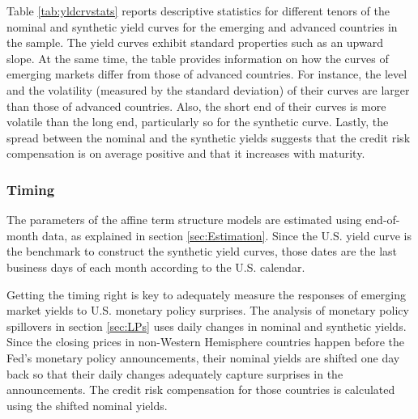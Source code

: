 {Table \ref{tab:yldcrvstats} reports descriptive statistics for different tenors of the nominal and synthetic yield curves for the emerging and advanced countries in the sample. 
The yield curves exhibit standard properties such as an 
upward slope.
At the same time, the table provides information on how the curves of emerging markets differ from those of advanced countries. 
For instance, the level and the volatility (measured by the standard deviation) of their curves %
are larger than those of advanced countries.
Also, the short end of their curves is more volatile than the long end, particularly so for the synthetic curve.
Lastly, the spread between the nominal and the synthetic yields suggests that the credit risk compensation is on average positive and that it increases with maturity.




\subsubsection{Timing}
The parameters of the affine term structure models are estimated using end-of-month data, as explained in section \ref{sec:Estimation}.
Since the U.S. yield curve is the benchmark to construct the synthetic yield curves, those dates are the last business days of each month according to the U.S. calendar.

Getting the timing right is key to adequately measure the responses of emerging market yields to U.S. monetary policy surprises.
The analysis of monetary policy spillovers in section \ref{sec:LPs} uses daily changes in nominal and synthetic yields. %
Since the closing prices in non-Western Hemisphere countries happen before the Fed's monetary policy announcements, 
their nominal yields are shifted one day back 
so that their daily changes adequately capture surprises in the announcements.
The credit risk compensation for those countries is calculated using the shifted nominal yields.

}
